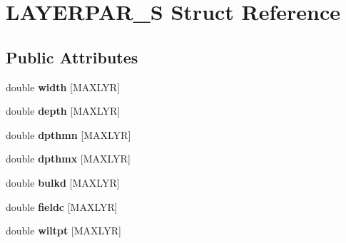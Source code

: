 \hypertarget{struct_l_a_y_e_r_p_a_r___s}{\section{L\-A\-Y\-E\-R\-P\-A\-R\-\_\-\-S Struct Reference}
\label{struct_l_a_y_e_r_p_a_r___s}
}
\subsection*{Public Attributes}
\begin{DoxyCompactItemize}
\item 
\hypertarget{struct_l_a_y_e_r_p_a_r___s_a08c90e7e16a6a6d24cd0002804afec28}{double {\bfseries width} \mbox{[}M\-A\-X\-L\-Y\-R\mbox{]}}\label{struct_l_a_y_e_r_p_a_r___s_a08c90e7e16a6a6d24cd0002804afec28}

\item 
\hypertarget{struct_l_a_y_e_r_p_a_r___s_a1b8e2982f435119be839bfc9a5b26417}{double {\bfseries depth} \mbox{[}M\-A\-X\-L\-Y\-R\mbox{]}}\label{struct_l_a_y_e_r_p_a_r___s_a1b8e2982f435119be839bfc9a5b26417}

\item 
\hypertarget{struct_l_a_y_e_r_p_a_r___s_a2e9077b7be3712f7e6f27424c821c77c}{double {\bfseries dpthmn} \mbox{[}M\-A\-X\-L\-Y\-R\mbox{]}}\label{struct_l_a_y_e_r_p_a_r___s_a2e9077b7be3712f7e6f27424c821c77c}

\item 
\hypertarget{struct_l_a_y_e_r_p_a_r___s_a0847817b46e5258e0acf6ac9000b4f70}{double {\bfseries dpthmx} \mbox{[}M\-A\-X\-L\-Y\-R\mbox{]}}\label{struct_l_a_y_e_r_p_a_r___s_a0847817b46e5258e0acf6ac9000b4f70}

\item 
\hypertarget{struct_l_a_y_e_r_p_a_r___s_a9bea6a11aa74c913104485705e890450}{double {\bfseries bulkd} \mbox{[}M\-A\-X\-L\-Y\-R\mbox{]}}\label{struct_l_a_y_e_r_p_a_r___s_a9bea6a11aa74c913104485705e890450}

\item 
\hypertarget{struct_l_a_y_e_r_p_a_r___s_a783b1e0cace8c37df2b284a0e1c5c995}{double {\bfseries fieldc} \mbox{[}M\-A\-X\-L\-Y\-R\mbox{]}}\label{struct_l_a_y_e_r_p_a_r___s_a783b1e0cace8c37df2b284a0e1c5c995}

\item 
\hypertarget{struct_l_a_y_e_r_p_a_r___s_a723d6b1afd11aa80ff10aaac695f3865}{double {\bfseries wiltpt} \mbox{[}M\-A\-X\-L\-Y\-R\mbox{]}}\label{struct_l_a_y_e_r_p_a_r___s_a723d6b1afd11aa80ff10aaac695f3865}


\end{DoxyCompactItemize}
